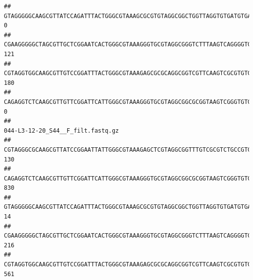 \documentclass[]{article}
\begin{document}
\begin{verbatim}
## GTAGGGGGCAAGCGTTATCCAGATTTACTGGGCGTAAAGCGCGTGTAGGCGGCTGGTTAGGTGTGATGTGAAATCTTCCGGCTCAACCGGAAAACTGCATTGCAAACCGGCCTGGCTAGAGTGCAGGAGAGGGAAGCGGAATTCCAGGTGTAGCGGTGAAATGCGTAGATATCTGGAGGAACACCAGTGGCGAAGGCGGCTTCCTGGCCTGCAACTGACGCTGAGACGCGAAAGCGTGGGGAGCGAAC                                 0
## CGAAGGGGGCTAGCGTTGCTCGGAATCACTGGGCGTAAAGGGTGCGTAGGCGGGTCTTTAAGTCAGGGGTGAAATCCTGGAGCTCAACTCCAGAACTGCCTTTGATACTGAAGATCTTGAGTTCGGGAGAGGTGAGTGGAACTGCGAGTGTAGAGGTGAAATTCGTAGATATTCGCAAGAACACCAGTGGCGAAGGCGGCTCACTGGCCCGATACTGACGCTGAGGCACGAAAGCGTGGGGAGCAAACA                              121
## CGTAGGTGGCAAGCGTTGTCCGGATTTACTGGGCGTAAAGAGCGCGCAGGCGGTCGTTCAAGTCGCGTGTGAAAGCCCCCGGCTCAACTGGGGAGGGTCACGCGATACTGATCGACTCGAAGGCAGGAGAGGGTAGTGGAATTCCCGGTGTAGTGGTGAAATGCGTAGATATCGGGAGGAACACCAGTGGCGAAGGCGACTACCTGGCCTGTTCTTGACGCTGAGGCGCGAAAGCTAGGGGAGCAAACG                              180
## CAGAGGTCTCAAGCGTTGTTCGGATTCATTGGGCGTAAAGGGTGCGTAGGCGGCGCGGTAAGTCGGGTGTGAAATCTCGGGGCTTAACTCCGAAACTGCATTCGATACTGCCGTGCTTGAGGACTGGAGAGGAGACTGGAATTTACGGTGTAGCGGTGAAATGCGTAGATATCGTAAGGAAGACCAGTGGCGAAGGCGGGTCTCTGGACAGTTCCTGACGCTGAGGCACGAAGGCCAGGGGAGCAAACG                                0
##                                                                                                                                                                                                                                                           044-L3-12-20_S44__F_filt.fastq.gz
## CGTAGGGCGCAAGCGTTATCCGGAATTATTGGGCGTAAAGAGCTCGTAGGCGGTTTGTCGCGTCTGCCGTGAAAGTCCGGGGCTCAACTCCGGATCTGCGGTGGGTACGGGCAGACTAGAGTGATGTAGGGGAGACTGGAATTCCTGGTGTAGCGGTGAAATGCGCAGATATCAGGAGGAACACCGATGGCGAAGGCAGGTCTCTGGGCATTAACTGACGCTGAGGAGCGAAAGCATGGGGAGCGAACA                               130
## CAGAGGTCTCAAGCGTTGTTCGGATTCATTGGGCGTAAAGGGTGCGTAGGCGGCGCGGTAAGTCGGGTGTGAAATCTCGGAGCTTAACTCCGAAACTGCATTCGATACTGCCGTGCTTGAGGACTGGAGAGGAGACTGGAATTTACGGTGTAGCGGTGAAATGCGTAGATATCGTAAGGAAGACCAGTGGCGAAGGCGGGTCTCTGGACAGTTCCTGACGCTGAGGCACGAAGGCCAGGGGAGCAAACG                               830
## GTAGGGGGCAAGCGTTATCCAGATTTACTGGGCGTAAAGCGCGTGTAGGCGGCTGGTTAGGTGTGATGTGAAATCTTCCGGCTCAACCGGAAAACTGCATTGCAAACCGGCCTGGCTAGAGTGCAGGAGAGGGAAGCGGAATTCCAGGTGTAGCGGTGAAATGCGTAGATATCTGGAGGAACACCAGTGGCGAAGGCGGCTTCCTGGCCTGCAACTGACGCTGAGACGCGAAAGCGTGGGGAGCGAAC                                 14
## CGAAGGGGGCTAGCGTTGCTCGGAATCACTGGGCGTAAAGGGTGCGTAGGCGGGTCTTTAAGTCAGGGGTGAAATCCTGGAGCTCAACTCCAGAACTGCCTTTGATACTGAAGATCTTGAGTTCGGGAGAGGTGAGTGGAACTGCGAGTGTAGAGGTGAAATTCGTAGATATTCGCAAGAACACCAGTGGCGAAGGCGGCTCACTGGCCCGATACTGACGCTGAGGCACGAAAGCGTGGGGAGCAAACA                               216
## CGTAGGTGGCAAGCGTTGTCCGGATTTACTGGGCGTAAAGAGCGCGCAGGCGGTCGTTCAAGTCGCGTGTGAAAGCCCCCGGCTCAACTGGGGAGGGTCACGCGATACTGATCGACTCGAAGGCAGGAGAGGGTAGTGGAATTCCCGGTGTAGTGGTGAAATGCGTAGATATCGGGAGGAACACCAGTGGCGAAGGCGACTACCTGGCCTGTTCTTGACGCTGAGGCGCGAAAGCTAGGGGAGCAAACG                               561

\end{verbatim}
\end{document}
